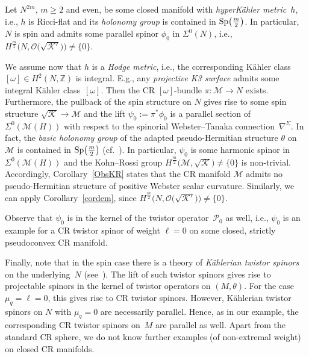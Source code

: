 \documentclass[pdftex]{sigma}
\numberwithin{equation}{section}
\newcommand{\ZZ}{\mathbb{Z}}
\begin{document}
\begin{Example} Let $N^{2m}$, $m\geq 2$ and even, be some closed manifold with {\em hyperK\"ahler metric}~$h$, i.e.,
$h$ is Ricci-flat and its {\em holonomy group} is contained in ${\rm Sp}\big(\frac{m}{2}\big)$.
In particular, $N$ is spin and admits some parallel spinor $\phi_0$ in $\Sigma^0(N)$, i.e., $H^{\frac{m}{2}}\big(N,\mathcal{O}\big(\sqrt{\mathcal{K}'}\big)\big)\neq \{0\}$.

We assume now that $h$ is a {\em Hodge metric}, i.e., the corresponding K\"ahler class $[\omega]\in H^2(N,\ZZ)$ is integral.
E.g., any {\em projective K3 surface} admits some integral K\"ahler class~$[\omega]$.
Then the CR $[\omega]$-bundle $\pi\colon \mathcal{M}\to N$ exists. Furthermore, the pullback of the spin structure on $N$ gives rise to some spin structure
$\sqrt{\mathcal{K}}\to\mathcal{M}$ and the lift $\psi_0:=\pi^*\phi_0$ is a parallel section of $\Sigma^0(\mathcal{M}(H))$ with respect to
the spinorial Webster--Tanaka connection~$\nabla^\Sigma$.
In fact, the {\em basic holonomy group} of the adapted pseudo-Hermitian structure $\theta$ on $\mathcal{M}$
is contained in ${\rm Sp}\big(\frac{m}{2}\big)$ (cf.~\cite{LeiN2}). In
particular, $\psi_0$ is some harmonic spinor in $\Sigma^0(\mathcal{M}(H))$ and the Kohn--Rossi group
$H^{\frac{m}{2}}\big(\mathcal{M},\sqrt{\mathcal{K}}\big)\neq \{0\}$ is non-trivial. Accordingly, Corollary~\ref{ObsKR} states that the CR manifold $\mathcal{M}$ admits no pseudo-Hermitian
structure of positive Webster scalar curvature. Similarly, we can apply Corollary~\ref{cordem}, since $H^{\frac{m}{2}}\big(N,\mathcal{O}\big(\sqrt{\mathcal{K}'}\big)\big)\neq \{0\}$.

Observe that $\psi_0$ is in the kernel of the twistor operator~$\mathcal{P}_0$ as well, i.e.,
$\psi_0$ is an example for a CR twistor spinor of weight $\ell=0$ on some closed, strictly pseudoconvex CR manifold.

Finally, note that in the spin case there is a theory of {\em K\"ahlerian twistor spinors} on
the underlying~$N$ (see~\cite{Mor,Pil}). The lift of such twistor spinors gives rise
to projectable spinors in the kernel of twistor operators on $(M,\theta)$. For the case $\mu_q=\ell=0$, this gives rise to CR twistor spinors.
However, K\"ahlerian twistor spinors on $N$ with $\mu_q=0$ are necessarily parallel. Hence, as in our example,
the corresponding CR twistor spinors on~$M$ are parallel as well. Apart from the standard CR sphere, we do not know
further examples (of non-extremal weight) on closed CR manifolds.
\end{Example}
\end{document}

